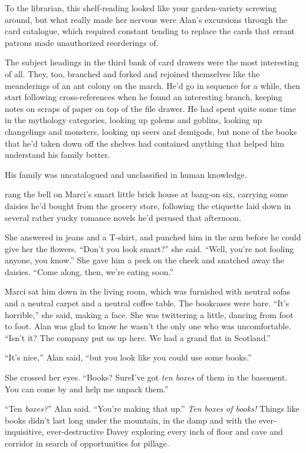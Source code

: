 To the librarian, this shelf-reading looked like your garden-variety
screwing around, but what really made her nervous were Alan's
excursions through the card catalogue, which required constant tending
to replace the cards that errant patrons made unauthorized reorderings
of.

The subject headings in the third bank of card drawers were the most
interesting of all.  They, too, branched and forked and rejoined
themselves like the meanderings of an ant colony on the march.  He'd
go in sequence for a while, then start following cross-references when
he found an interesting branch, keeping notes on scraps of paper on
top of the file drawer.  He had spent quite some time in the mythology
categories, looking up golems and goblins, looking up changelings and
monsters, looking up seers and demigods, but none of the books that
he'd taken down off the shelves had contained anything that helped him
understand his family better.

His family was uncatalogued and unclassified in human knowledge.

 rang the bell on Marci's smart little brick house at bang-on six,
carrying some daisies he'd bought from the grocery store, following
the etiquette laid down in several rather yucky romance novels he'd
perused that afternoon.

She answered in jeans and a T-shirt, and punched him in the arm before
he could give her the flowers.  ``Don't you look smart?'' she said. 
``Well, you're not fooling anyone, you know.'' She gave him a peck on
the cheek and snatched away the daisies.  ``Come along, then, we're
eating soon.''

Marci sat him down in the living room, which was furnished with
neutral sofas and a neutral carpet and a neutral coffee table.  The
bookcases were bare.  ``It's horrible,'' she said, making a face.  She
was twittering a little, dancing from foot to foot.  Alan was glad to
know he wasn't the only one who was uncomfortable.  ``Isn't it?  The
company put us up here.  We had a grand flat in Scotland.''

``It's nice,'' Alan said, ``but you look like you could use some
books.''

She crossed her eyes.  ``Books?  Sure\dash{}I've got \textit{ten boxes} of
them in the basement.  You can come by and help me unpack them.''

``Ten \textit{boxes?}'' Alan said.  ``You're making that up.''
\textit{Ten boxes of books!} Things like books didn't last long under
the mountain, in the damp and with the ever-inquisitive,
ever-destructive Davey exploring every inch of floor and cave and
corridor in search of opportunities for pillage.

